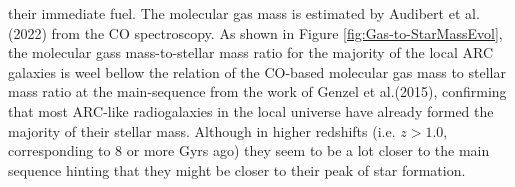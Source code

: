 their immediate fuel. The molecular gas mass is estimated by Audibert et al. (2022)\cite{Audibert2022} from the CO spectroscopy. As shown in Figure \ref{fig:Gas-to-StarMassEvol}, the molecular gass mass-to-stellar mass ratio for the majority of the local ARC galaxies is weel bellow the relation of the CO-based molecular gas mass to stellar
mass ratio at the main-sequence from the work of Genzel et al.(2015)\cite{Genzel2015}, confirming that most ARC-like radiogalaxies in the local universe have already formed the majority of their stellar mass. Although in higher redshifts (i.e. $z>1.0$, corresponding to 8 or more Gyrs ago) they seem to be a lot closer to the main sequence hinting that they might be closer to their peak of star formation.\\


